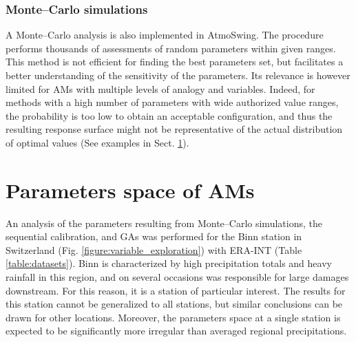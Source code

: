 \documentclass[gmd]{copernicus}
\begin{document}
\subsubsection{Monte--Carlo simulations}
\label{sec:monte-carlo}

A Monte--Carlo analysis is also implemented in AtmoSwing. The procedure performs thousands of assessments of random parameters within given ranges. This method is not efficient for finding the best parameters set, but facilitates a better understanding of the sensitivity of the parameters. Its relevance is however limited for AMs with multiple levels of analogy and variables. Indeed, for methods with a high number of parameters with wide authorized value ranges, the probability is too low to obtain an acceptable configuration, and thus the resulting response surface might not be representative of the actual distribution of optimal values (See examples in Sect. \ref{sec:parameters-space}). 


\section{Parameters space of AMs}
\label{sec:parameters-space}

An analysis of the parameters resulting from Monte--Carlo simulations, the sequential calibration, and GAs was performed for the Binn station in Switzerland (Fig. \ref{figure:variable_exploration}) with ERA-INT (Table \ref{table:datasets}). Binn is characterized by high precipitation totals and heavy rainfall in this region, and on several occasions was responsible for large damages downstream. For this reason, it is a station of particular interest. The results for this station cannot be generalized to all stations, but similar conclusions can be drawn for other locations. Moreover, the parameters space at a single station is expected to be significantly more irregular than averaged regional precipitations.
\end{document}
